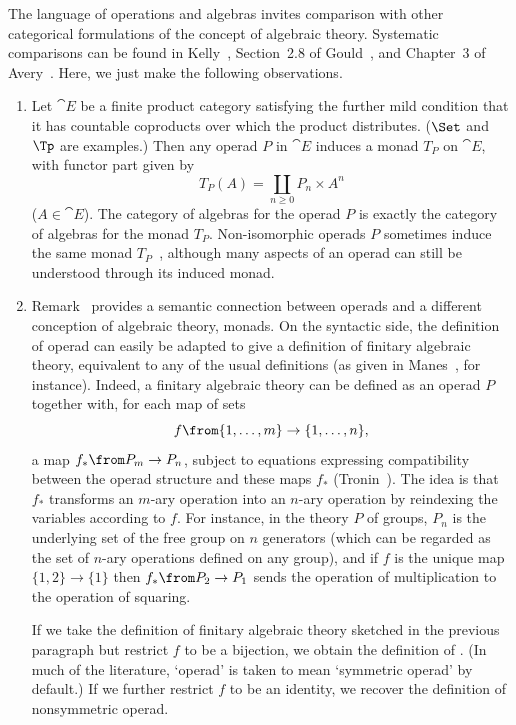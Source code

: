 \begin{remarks}
The language of operations and algebras invites comparison with other
categorical formulations of the concept of algebraic theory.  Systematic
comparisons can be found in Kelly~\cite{KellOOJ}, Section~2.8 of
Gould~\cite{GoulCCO}, and Chapter~3 of Avery~\cite{AverSS}.  Here, we just
make the following observations.
% 
\begin{enumerate}
\item 
{}
Let $\cat{E}$ be a finite product category satisfying the further mild
condition that it has countable coproducts over which the product
distributes.  ($\Set$ and $\Tp$ are examples.)  Then any operad $P$ in
$\cat{E}$ induces a monad%
%
%
% 
$T_P$ on $\cat{E}$, with functor part given by
\[
T_P(A) = \coprod_{n \geq 0} P_n \times A^n
\]
($A \in \cat{E}$).  The category of algebras for the
operad $P$ is exactly the category of algebras for the monad $T_P$.
Non-isomorphic operads $P$ sometimes induce the same monad
$T_P$~\cite{AOAT}, although many aspects of an operad can still be
understood through its induced monad.

\item
{}
Remark~ provides a semantic connection between
operads and a different conception of algebraic theory, monads.  On the
syntactic side, the definition of operad can easily be adapted to give a
definition of finitary algebraic theory, equivalent to any of the usual
definitions (as given in Manes~\cite{ManeAT}, for instance).  Indeed,
a finitary algebraic theory can be defined as an operad $P$ together with,
for each map of sets
\[
f \from \{1, \ldots, m\} \to \{1, \ldots, n\},
\]
a map $f_* \from P_m \to P_n$, subject to equations expressing
compatibility between the operad structure and these maps $f_*$
(Tronin~\cite{TronACO,TronOVA}).  The idea is that $f_*$ transforms an
$m$-ary operation into an $n$-ary operation by reindexing the variables
according to $f$.  For instance, in the theory $P$ of groups, $P_n$ is the
underlying set of the free group on $n$ generators (which can be regarded
as the set of $n$-ary operations defined on any group), and if $f$ is the
unique map $\{1, 2\} \to \{1\}$ then $f_*\from P_2 \to P_1$ sends the
operation of multiplication to the operation of squaring.

If we take the definition of finitary algebraic theory sketched in the
previous paragraph but restrict $f$ to be a bijection, we obtain the
definition of
.  (In much of the literature, `operad' is taken to mean `symmetric
operad' by default.)  If we further restrict $f$ to be an identity, we
recover the definition of nonsymmetric operad.


\end{enumerate}
\end{remarks}
